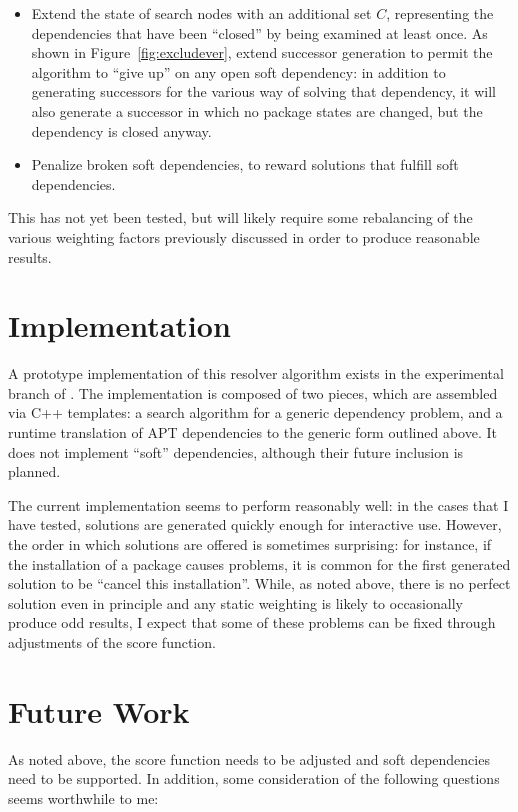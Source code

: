 \documentclass[letterpaper]{article}
\theoremstyle{definition}
\theoremstyle{remark}
\newcommand{\pkg}[1]{\text{\url{#1}}}
\begin{document}
\begin{itemize}
\item Extend the state of search nodes with an additional set $C$,
  representing the dependencies that have been ``closed'' by being
  examined at least once.  As shown in Figure~\vref{fig:excludever},
  extend successor generation to permit the algorithm to ``give up''
  on any open soft dependency: in addition to generating successors
  for the various way of solving that dependency, it will also
  generate a successor in which no package states are changed, but the
  dependency is closed anyway.
\item Penalize broken soft dependencies, to reward solutions that
  fulfill soft dependencies.
\end{itemize}

This has not yet been tested, but will likely require some rebalancing
of the various weighting factors previously discussed in order to
produce reasonable results.

\section{Implementation}

A prototype implementation of this resolver algorithm exists in the
experimental branch of \pkg{aptitude}.  The implementation is composed
of two pieces, which are assembled via C++ templates: a search
algorithm for a generic dependency problem, and a runtime translation
of APT dependencies to the generic form outlined above.  It does not
implement ``soft'' dependencies, although their future inclusion is
planned.

The current implementation seems to perform reasonably well: in the
cases that I have tested, solutions are generated quickly enough for
interactive use.  However, the order in which solutions are offered is
sometimes surprising: for instance, if the installation of a package
causes problems, it is common for the first generated solution to be
``cancel this installation''.  While, as noted above, there is no
perfect solution even in principle and any static weighting is likely
to occasionally produce odd results, I expect that some of these
problems can be fixed through adjustments of the score function.

\section{Future Work}

As noted above, the score function needs to be adjusted and soft
dependencies need to be supported.  In addition, some consideration of
the following questions seems worthwhile to me:
\end{document}
